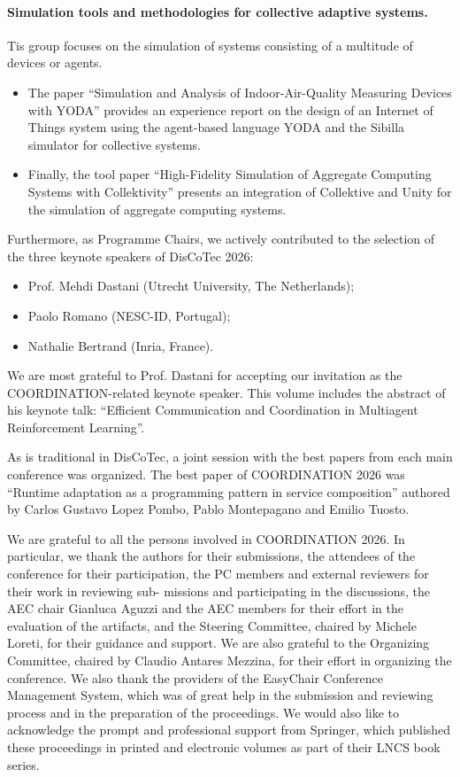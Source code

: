 \documentclass[]{llncs}
\begin{document}
\paragraph{Simulation tools and methodologies for collective adaptive systems.} Tis group focuses on the simulation of systems consisting of a multitude of devices or agents. 
\begin{itemize}
\item The paper   ``Simulation and Analysis of Indoor-Air-Quality Measuring Devices with YODA'' provides an experience report on the design of an Internet of Things system using the agent-based language YODA and the Sibilla simulator for collective systems. \item Finally, the tool paper ``High-Fidelity Simulation of Aggregate Computing Systems with Collektivity'' presents an integration of Collektive and Unity for the simulation of aggregate computing systems.
\end{itemize}


Furthermore, as Programme Chairs, we actively contributed to the selection of the three keynote
speakers of DisCoTec 2026:\begin{itemize}
	\item Prof. Mehdi Dastani (Utrecht University, The Netherlands);
	\item Paolo Romano (NESC-ID, Portugal);
	\item Nathalie Bertrand (Inria, France).
\end{itemize}
We are most grateful to Prof. Dastani for accepting our invitation as the  COORDINATION-related keynote speaker. This volume includes the abstract of his keynote
talk: “Efficient Communication and Coordination in Multiagent Reinforcement Learning”.


As is traditional in DisCoTec, a joint session with the best papers from each main conference was organized. The best paper of COORDINATION 2026 was “Runtime adaptation as a programming pattern in service composition” authored by Carlos Gustavo Lopez Pombo, Pablo Montepagano and Emilio Tuosto. 

We are grateful to all the persons involved in COORDINATION 2026. In particular,
we thank the authors for their submissions, the attendees of the conference for their
participation, the PC members and external reviewers for their work in reviewing sub-
missions and participating in the discussions, the AEC chair Gianluca Aguzzi and
the AEC members for their effort in the evaluation of the artifacts, and the Steering Committee,
chaired by Michele Loreti, for their guidance and support. We are also grateful to the
Organizing Committee, chaired by Claudio Antares Mezzina, for their effort in organizing the conference. We also thank
the providers of the EasyChair Conference Management System, which was of great
help in the submission and reviewing process and in the preparation of the proceedings.
We would also like to acknowledge the prompt and professional support from Springer,
which published these proceedings in printed and electronic volumes as part of their
LNCS book series.
\end{document}
